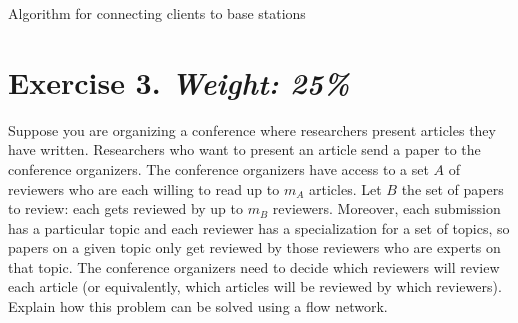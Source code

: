 \documentclass{article}
\begin{document}
\begin{algorithm}[ht!]
  \DontPrintSemicolon


    \caption{Algorithm for connecting clients to base stations}
\end{algorithm}

\newpage
\section*{Exercise 3. \textit{Weight: 25\%}}
Suppose you are organizing a conference where researchers present articles they have written. Researchers who want to present an article send a paper to the conference organizers. The
conference organizers have access to a set $A$ of reviewers who are each willing to read up to $m_A$
articles. Let $B$ the set of papers to review: each gets reviewed by up to $m_B$ reviewers. Moreover, each submission has a particular topic and each reviewer has a specialization for a set of topics, so papers on a given topic only get reviewed by those reviewers who are experts on that topic. The conference organizers need to decide which reviewers will review each article (or equivalently, which articles will be reviewed by which reviewers). Explain how this problem can be solved using a flow network.
\end{document}
